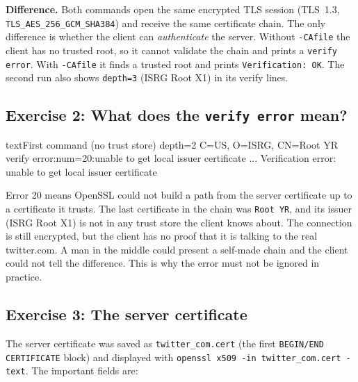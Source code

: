             \textbf{Difference.} Both commands open the same encrypted TLS session (TLS~1.3,
            \texttt{TLS\_AES\_256\_\allowbreak GCM\_SHA384}) and receive the same certificate chain. The
            only difference is whether the client can \emph{authenticate} the server. Without
            \texttt{-CAfile} the client has no trusted root, so it cannot validate the chain and
            prints a \texttt{verify error}. With \texttt{-CAfile} it finds a trusted root and prints
            \texttt{Verification: OK}. The second run also shows \texttt{depth=3} (ISRG Root X1)
            in its verify lines.

        \subsection{Exercise 2: What does the \texttt{verify error} mean?}

            \begin{codeblock}[]{text}{First command (no trust store)}
                depth=2 C=US, O=ISRG, CN=Root YR
                verify error:num=20:unable to get local issuer certificate
                ...
                Verification error: unable to get local issuer certificate
            \end{codeblock}

            Error 20 means OpenSSL could not build a path from the server certificate up to a
            certificate it trusts. The last certificate in the chain was
            \texttt{Root YR}, and its issuer (ISRG Root X1) is not in any trust store the client
            knows about. The connection is still encrypted, but the client has no proof that it
            is talking to the real twitter.com. A man in the middle could present a self-made
            chain and the client could not tell the difference. This is why the error must not
            be ignored in practice.

        \subsection{Exercise 3: The server certificate}

            The server certificate was saved as \texttt{twitter\_com.cert} (the first
            \texttt{BEGIN/END CERTIFICATE} block) and displayed with
            \texttt{openssl x509 -in twitter\_com.cert -text}. The important fields are:

